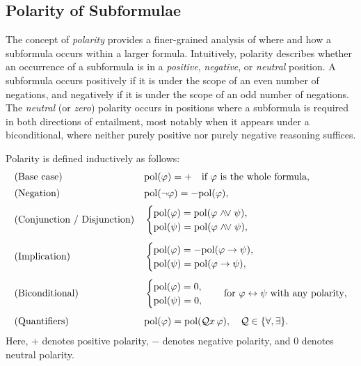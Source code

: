 \subsection{Polarity of Subformulae}

The concept of \emph{polarity} provides a finer-grained analysis of where and how a subformula occurs within a larger formula.
Intuitively, polarity describes whether an occurrence of a subformula is in a \emph{positive}, \emph{negative}, or \emph{neutral} position.
A subformula occurs positively if it is under the scope of an even number of negations, and negatively if it is under the scope of an odd number of negations.
The \emph{neutral} (or \emph{zero}) polarity occurs in positions where a subformula is required in both directions of entailment, most notably when it appears under a biconditional, where neither purely positive nor purely negative reasoning suffices.

Polarity is defined inductively as follows:
\[
\begin{aligned}
&\text{(Base case)} && \mathrm{pol}(\varphi) = + \quad \text{if } \varphi \text{ is the whole formula}, \\[2pt]
&\text{(Negation)} && \mathrm{pol}(\neg \varphi) = -\mathrm{pol}(\varphi), \\[2pt]
&\text{(Conjunction / Disjunction)} && 
\begin{cases}
\mathrm{pol}(\varphi) = \mathrm{pol}(\varphi \mathrel{\land\mkern-3mu\lor} \psi), \\
\mathrm{pol}(\psi) = \mathrm{pol}(\varphi \mathrel{\land\mkern-3mu\lor} \psi),
\end{cases} \\[4pt]
&\text{(Implication)} && 
\begin{cases}
\mathrm{pol}(\varphi) = -\mathrm{pol}(\varphi \rightarrow \psi), \\
\mathrm{pol}(\psi) = \mathrm{pol}(\varphi \rightarrow \psi),
\end{cases} \\[4pt]
&\text{(Biconditional)} && 
\begin{cases}
\mathrm{pol}(\varphi) = 0, \\
\mathrm{pol}(\psi) = 0,
\end{cases} \quad \text{for } \varphi \leftrightarrow \psi \text{ with any polarity}, \\[4pt]
&\text{(Quantifiers)} && \mathrm{pol}(\varphi) = \mathrm{pol}(\mathcal{Q} x\, \varphi), \quad \mathcal{Q} \in \{\forall, \exists\}.
\end{aligned}
\]
Here, \(+\) denotes positive polarity, \(-\) denotes negative polarity, and \(0\) denotes neutral polarity.



